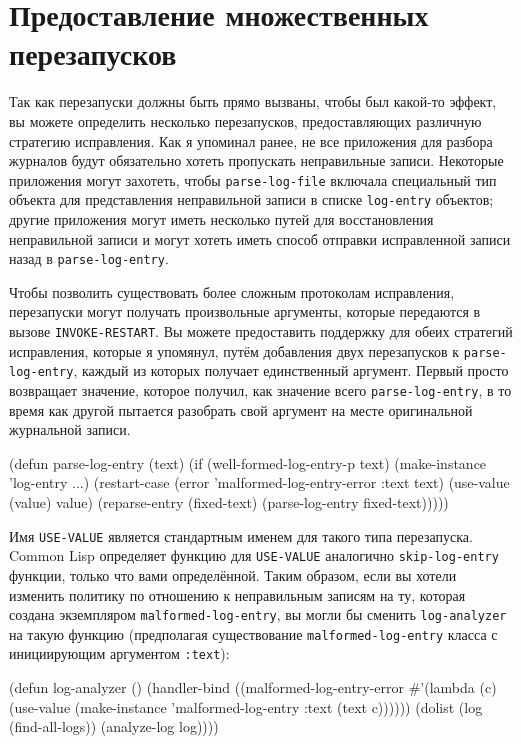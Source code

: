 \section{Предоставление множественных перезапусков}

Так как перезапуски должны быть прямо вызваны, чтобы был какой-то эффект, вы можете
определить несколько перезапусков, предоставляющих различную стратегию исправления. Как я
упоминал ранее, не все приложения для разбора журналов будут обязательно хотеть пропускать
неправильные записи. Некоторые приложения могут захотеть, чтобы \lstinline{parse-log-file}
включала специальный тип объекта для представления неправильной записи в списке
\lstinline{log-entry} объектов; другие приложения могут иметь несколько путей для
восстановления неправильной записи и могут хотеть иметь способ отправки исправленной
записи назад в \lstinline{parse-log-entry}.

Чтобы позволить существовать более сложным протоколам исправления, перезапуски могут
получать произвольные аргументы, которые передаются в вызове \lstinline{INVOKE-RESTART}. Вы
можете предоставить поддержку для обеих стратегий исправления, которые я упомянул, путём
добавления двух перезапусков к \lstinline{parse-log-entry}, каждый из которых получает
единственный аргумент. Первый просто возвращает значение, которое получил, как значение
всего \lstinline{parse-log-entry}, в то время как другой пытается разобрать свой аргумент на
месте оригинальной журнальной записи.

\begin{myverb}
(defun parse-log-entry (text)
  (if (well-formed-log-entry-p text)
    (make-instance 'log-entry ...)
    (restart-case (error 'malformed-log-entry-error :text text)
      (use-value (value) value)
      (reparse-entry (fixed-text) (parse-log-entry fixed-text)))))
\end{myverb}

Имя \lstinline{USE-VALUE} является стандартным именем для такого типа перезапуска. Common Lisp
определяет функцию для \lstinline{USE-VALUE} аналогично \lstinline{skip-log-entry} функции, только
что вами определённой. Таким образом, если вы хотели изменить политику по отношению к
неправильным записям на ту, которая создана экземпляром \lstinline{malformed-log-entry}, вы
могли бы сменить \lstinline{log-analyzer} на такую функцию (предполагая существование
\lstinline{malformed-log-entry} класса с инициирующим аргументом \lstinline{:text}):

\begin{myverb}
(defun log-analyzer ()
  (handler-bind ((malformed-log-entry-error
                  #'(lambda (c)
                      (use-value
                       (make-instance 'malformed-log-entry :text (text c))))))
    (dolist (log (find-all-logs))
      (analyze-log log))))
\end{myverb}


